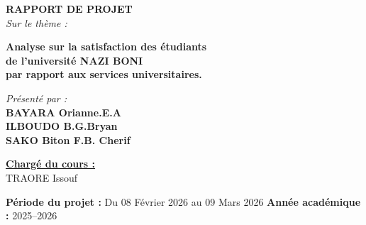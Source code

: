 \documentclass[
12pt,          %
a4paper,       %
oneside,      %
openright      %
]{report}          %
\begin{document}
\begin{titlepage}
\begin{tcolorbox}
			\begin{center}
				{\Large\textbf{\textcolor{couleurPrimaire}{RAPPORT DE PROJET}}}\\[5pt]
				{\small\textit{Sur le thème :}}
			\end{center}
			
			\vspace{0.3cm}
			\begin{tcolorbox}[
				enhanced,
				colback=couleurPrimaire!8,
				colframe=couleurPrimaire,
				boxrule=1pt,
				arc=6pt,
				halign=center,
				left=8pt, right=8pt,
				top=6pt, bottom=6pt
				]
				\begin{center}
					\large\bfseries\color{black}
					Analyse sur la satisfaction des \'etudiants\\
					de l'universit\'e NAZI BONI\\
					par rapport aux services universitaires.
				\end{center}
			\end{tcolorbox}
			
			\vspace{0.5cm}
			\begin{center}
				{\small\textit{Présenté par :}}\\[5pt]
				{\Large\bfseries\color{couleurPrimaire}
					BAYARA Orianne.E.A\\
					ILBOUDO B.G.Bryan\\
					SAKO Biton F.B. Cherif
				}
			\end{center}
			
			\vspace{0.5cm}
			
			\noindent
			\begin{minipage}[t]{0.48\textwidth}
				\underline{\small\textbf{Charg\'e du cours :}}\\[4pt]
				TRAORE Issouf
			\end{minipage}
			
			\vfill
			\begin{center}
				\small
				\textbf{Période du projet :} Du 08 Février 2026 au 09 Mars 2026
				\hfill
				\textbf{Année académique :} 2025--2026
			\end{center}
			
			\end{tcolorbox}
		\end{titlepage}
		\clearpage
		{\renewcommand{\contentsname}{Table des matieres}
			\tableofcontents}
		\vspace{-2cm}
		\setcounter{page}{1}
		
\end{document}
